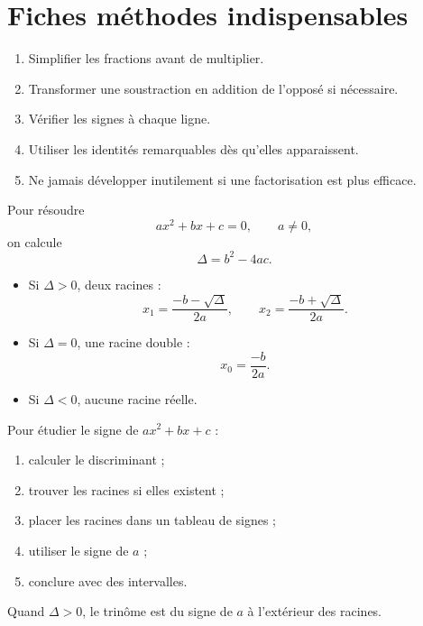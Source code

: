 \documentclass[11pt,a4paper]{article}
\begin{document}
\section{Fiches méthodes indispensables}

\begin{methode}
\begin{enumerate}
  \item Simplifier les fractions avant de multiplier.
  \item Transformer une soustraction en addition de l'opposé si nécessaire.
  \item Vérifier les signes à chaque ligne.
  \item Utiliser les identités remarquables dès qu'elles apparaissent.
  \item Ne jamais développer inutilement si une factorisation est plus efficace.
\end{enumerate}
\end{methode}

\begin{methode}
Pour résoudre
\[
ax^2+bx+c=0,\qquad a\neq0,
\]
on calcule
\[
\Delta=b^2-4ac.
\]
\begin{itemize}
  \item Si $\Delta>0$, deux racines :
  \[
  x_1=\frac{-b-\sqrt{\Delta}}{2a},
  \qquad
  x_2=\frac{-b+\sqrt{\Delta}}{2a}.
  \]
  \item Si $\Delta=0$, une racine double :
  \[
  x_0=\frac{-b}{2a}.
  \]
  \item Si $\Delta<0$, aucune racine réelle.
\end{itemize}
\end{methode}

\begin{methode}
Pour étudier le signe de $ax^2+bx+c$ :
\begin{enumerate}
  \item calculer le discriminant ;
  \item trouver les racines si elles existent ;
  \item placer les racines dans un tableau de signes ;
  \item utiliser le signe de $a$ ;
  \item conclure avec des intervalles.
\end{enumerate}
Quand $\Delta>0$, le trinôme est du signe de $a$ à l'extérieur des racines.
\end{methode}
\end{document}
